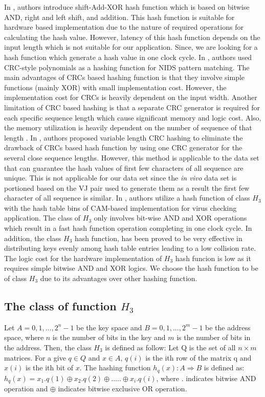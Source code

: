 In \cite{b31}, authors introduce shift-Add-XOR hash function which is based on bitwise AND, right and left shift, and addition. This hash function is suitable for hardware based implementation due to the nature of required operations for calculating the hash value. However, latency of this hash function depends on the input length which is not suitable for our application. Since, we are looking for a hash function which generate a hash value in one clock cycle. In \cite{b32}, authors used CRC-style polynomials as a hashing function for NIDS pattern matching. The main advantages of CRCs based hashing function is that they involve simple functions (mainly XOR) with small implementation cost. However, the implementation cost for CRCs is heavily dependent on the input width. Another limitation of CRC based hashing is that a separate CRC generator is required for each specific sequence length which cause significant memory and logic cost. Also, the memory utilization is heavily dependent on the number of sequence of that length \cite{b32}. In \cite{b33}, authors proposed variable length CRC hashing to eliminate the drawback of CRCs based hash function by using one CRC generator for the several close sequence lengths. However, this method is applicable to the data set that can guarantee the hash values of first few characters of all sequence are unique. This is not applicable for our data set since the \emph{in vivo} data set is portioned based on the VJ pair used to generate them as a result the first few character of all sequence is similar. 
In \cite{b30}, authors utilize a hash function of class $H_3$ with the hash table bins of CAM-based implementation \cite{b34} for virus checking application. The class of $H_3$ only involves bit-wise AND and XOR operations which result in a fast hash function operation completing in one clock cycle. In addition, the class $H_3$ hash function, has been proved to be very effective in distributing keys evenly among hash table entries \cite{b35} leading to a low collision rate. The logic cost for the hardware implementation of $H_3$ hash funcion is low as it requires simple bitwise AND and XOR logics. We choose the hash function to be of class $H_3$ due to its advantages over other hashing function. 


\subsection{The class of function $H_3$}\label{subsec:H3}
Let $A = {0, 1,..., 2^n-1}$ be the key space and $B = {0, 1,..., 2^m-1}$ be the address space, where $n$ is the number of bits in the key and $m$ is the number of bits in the address. Then, the class $H_3$ is defined as follow: Let Q is the set of all $n \times m$ matrices. For a give $q \in Q$ and $x \in A$, $q(i)$ is the ith row of the matrix q and $x(i)$ is the ith bit of $x$. The hashing function $h_q(x) : A  \Longrightarrow B$ is defined as:
$  h_q(x) = x_1.q(1) \oplus x_2.q(2) \oplus .....	\oplus x_i.q(i)$, where $.$ indicates bitwise AND operation and $\oplus$ indicates bitwise exclusive OR operation.

